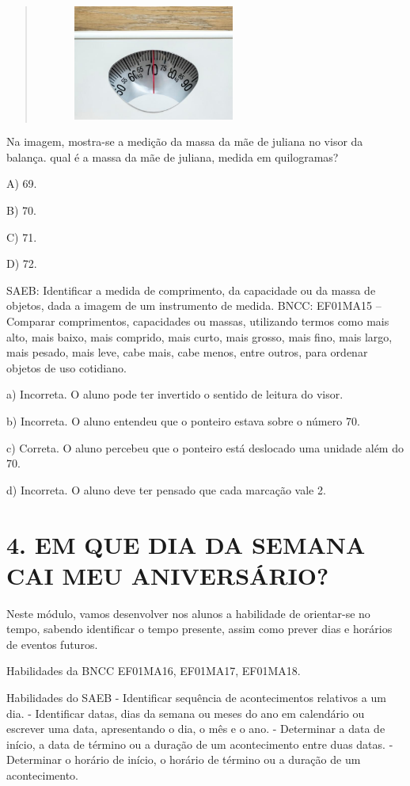 \begin{quote}
\includegraphics[width=3.03770in,height=1.48580in]{media/image33.jpg}
\end{quote}

Na imagem, mostra-se a medição da massa da mãe de juliana no visor da
balança. qual é a massa da mãe de juliana, medida em quilogramas?

A) 69.

B) 70.

C) 71.

D) 72.

SAEB: Identificar a medida de comprimento, da capacidade ou da
massa de objetos, dada a imagem de um instrumento de medida.
BNCC: EF01MA15 -- Comparar comprimentos, capacidades ou massas,
utilizando termos como mais alto, mais baixo, mais comprido, mais curto,
mais grosso, mais fino, mais largo, mais pesado, mais leve, cabe mais,
cabe menos, entre outros, para ordenar objetos de uso cotidiano.

a) Incorreta. O aluno pode ter invertido o sentido de leitura do visor.

b) Incorreta. O aluno entendeu que o ponteiro estava sobre o número 70.

c) Correta. O aluno percebeu que o ponteiro está deslocado uma unidade
além do 70.

d) Incorreta. O aluno deve ter pensado que cada marcação vale 2.

\section{4. EM QUE DIA DA SEMANA CAI MEU ANIVERSÁRIO?
}\label{muxf3dulo-4-em-que-dia-vai-cair-meu-aniversuxe1rio}

Neste módulo, vamos desenvolver nos alunos a habilidade de orientar-se no
tempo, sabendo identificar o tempo presente, assim como prever dias e
horários de eventos futuros.

Habilidades da BNCC
EF01MA16, EF01MA17, EF01MA18.

Habilidades do SAEB
- Identificar sequência de acontecimentos relativos a um dia.
- Identificar datas, dias da semana ou meses do ano em calendário ou
escrever uma data, apresentando o dia, o mês e o ano.
- Determinar a data de início, a data de término ou a duração de um
acontecimento entre duas datas.
- Determinar o horário de início, o horário de término ou a duração de
um acontecimento.

